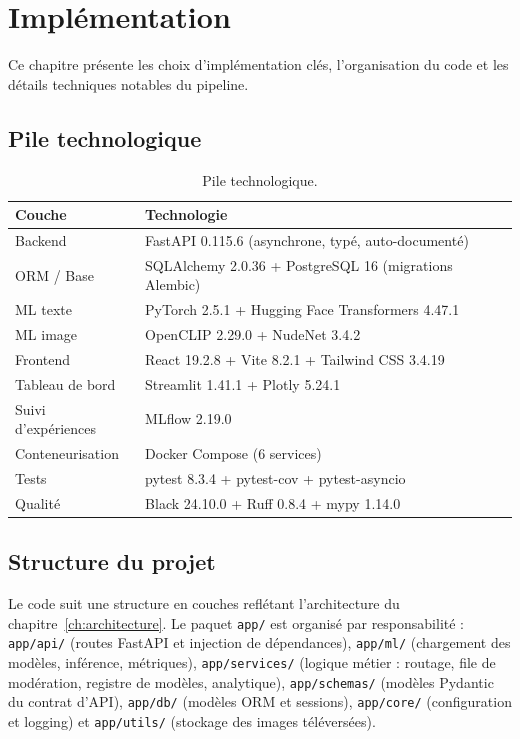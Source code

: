 \chapter{Implémentation}
\label{ch:implementation}

Ce chapitre présente les choix d'implémentation clés, l'organisation du code et les détails techniques notables du pipeline.

\section{Pile technologique}

\begin{table}[H]
\centering
\caption{Pile technologique.}
\label{tab:tech_stack}
\begin{tabularx}{\textwidth}{lX}
\toprule
\textbf{Couche} & \textbf{Technologie} \\
\midrule
Backend & FastAPI 0.115.6 (asynchrone, typé, auto-documenté) \\
ORM / Base & SQLAlchemy 2.0.36 + PostgreSQL 16 (migrations Alembic) \\
ML texte & PyTorch 2.5.1 + Hugging Face Transformers 4.47.1 \\
ML image & OpenCLIP 2.29.0 + NudeNet 3.4.2 \\
Frontend & React 19.2.8 + Vite 8.2.1 + Tailwind CSS 3.4.19 \\
Tableau de bord & Streamlit 1.41.1 + Plotly 5.24.1 \\
Suivi d'expériences & MLflow 2.19.0 \\
Conteneurisation & Docker Compose (6 services) \\
Tests & pytest 8.3.4 + pytest-cov + pytest-asyncio \\
Qualité & Black 24.10.0 + Ruff 0.8.4 + mypy 1.14.0 \\
\bottomrule
\end{tabularx}
\end{table}

\section{Structure du projet}

Le code suit une structure en couches reflétant l'architecture du chapitre~\ref{ch:architecture}. Le paquet \texttt{app/} est organisé par responsabilité : \texttt{app/api/} (routes FastAPI et injection de dépendances), \texttt{app/ml/} (chargement des modèles, inférence, métriques), \texttt{app/services/} (logique métier : routage, file de modération, registre de modèles, analytique), \texttt{app/schemas/} (modèles Pydantic du contrat d'API), \texttt{app/db/} (modèles ORM et sessions), \texttt{app/core/} (configuration et logging) et \texttt{app/utils/} (stockage des images téléversées).

